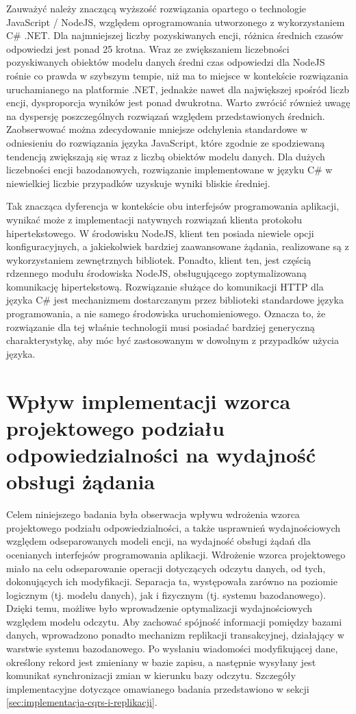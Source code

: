 Zauważyć należy znaczącą wyższość rozwiązania opartego o technologie JavaScript / NodeJS, względem oprogramowania utworzonego z wykorzystaniem C\# .NET. Dla najmniejszej liczby pozyskiwanych encji, różnica średnich czasów odpowiedzi jest ponad 25 krotna. Wraz ze zwiększaniem liczebności pozyskiwanych obiektów modelu danych średni czas odpowiedzi dla NodeJS rośnie co prawda w szybszym tempie, niż ma to miejsce w kontekście rozwiązania uruchamianego na platformie .NET, jednakże nawet dla największej spośród liczb encji, dysproporcja wyników jest ponad dwukrotna. Warto zwrócić również uwagę na dyspersję poszczególnych rozwiązań względem przedstawionych średnich. Zaobserwować można zdecydowanie mniejsze odchylenia standardowe w odniesieniu do rozwiązania języka JavaScript, które zgodnie ze spodziewaną tendencją zwiększają się wraz z liczbą obiektów modelu danych. Dla dużych liczebności encji bazodanowych, rozwiązanie implementowane w języku C\# w niewielkiej liczbie przypadków uzyskuje wyniki bliskie średniej.

Tak znacząca dyferencja w kontekście obu interfejsów programowania aplikacji, wynikać może z implementacji natywnych rozwiązań klienta protokołu hipertekstowego. W środowisku NodeJS, klient ten posiada niewiele opcji konfiguracyjnych, a jakiekolwiek bardziej zaawansowane żądania, realizowane są z wykorzystaniem zewnętrznych bibliotek. Ponadto, klient ten, jest częścią rdzennego modułu środowiska NodeJS, obsługującego zoptymalizowaną komunikację hipertekstową. Rozwiązanie służące do komunikacji HTTP dla języka C\# jest mechanizmem dostarczanym przez biblioteki standardowe języka programowania, a nie samego środowiska uruchomieniowego. Oznacza to, że rozwiązanie dla tej właśnie technologii musi posiadać bardziej generyczną charakterystykę, aby móc być zastosowanym w dowolnym z przypadków użycia języka.
\section{Wpływ implementacji wzorca projektowego podziału odpowiedzialności na wydajność obsługi żądania}
\label{sec:cqrs-and-database-improvements}
Celem niniejszego badania była obserwacja wpływu wdrożenia wzorca projektowego podziału odpowiedzialności, a także usprawnień wydajnościowych względem odseparowanych modeli encji, na wydajność obsługi żądań dla ocenianych interfejsów programowania aplikacji. Wdrożenie wzorca projektowego miało na celu odseparowanie operacji dotyczących odczytu danych, od tych, dokonujących ich modyfikacji. Separacja ta, występowała zarówno na poziomie logicznym (tj. modelu danych), jak i fizycznym (tj. systemu bazodanowego). Dzięki temu, możliwe było wprowadzenie optymalizacji wydajnościowych względem modelu odczytu. Aby zachować spójność informacji pomiędzy bazami danych, wprowadzono ponadto mechanizm replikacji transakcyjnej, działający w warstwie systemu bazodanowego. Po wysłaniu wiadomości modyfikującej dane, określony rekord jest zmieniany w bazie zapisu, a następnie wysyłany jest komunikat synchronizacji zmian w kierunku bazy odczytu. Szczegóły implementacyjne dotyczące omawianego badania przedstawiono w sekcji \ref{sec:implementacja-cqrs-i-replikacji}.

